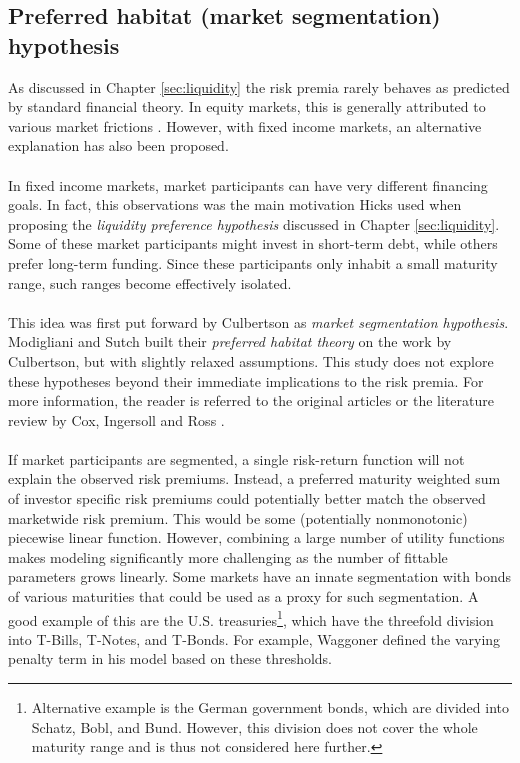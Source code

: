\documentclass[a4paper]{artikel3}
\numberwithin{equation}{section}
\numberwithin{theorem}{section}
\numberwithin{proposition}{section}
\numberwithin{lemma}{section}
\begin{document}
\subsection{Preferred habitat (market segmentation) hypothesis}
\label{sec:segmentation}


As discussed in Chapter \ref{sec:liquidity} the risk premia rarely behaves as predicted by standard financial theory. In equity markets, this is generally attributed to various market frictions \cite{baker_bradley_wurgler_2011, blitz_van_vliet_2007, frazzini_pedersen_2014}. However, with fixed income markets, an alternative explanation has also been proposed. \\
\\
In fixed income markets, market participants can have very different financing goals. In fact, this observations was the main motivation Hicks used when proposing the \emph{liquidity preference hypothesis} discussed in Chapter \ref{sec:liquidity}. Some of these market participants might invest in short-term debt, while others prefer long-term funding. Since these participants only inhabit a small maturity range, such ranges become effectively isolated. \\
\\
This idea was first put forward by Culbertson \cite{culbertson_1957} as \emph{market segmentation hypothesis}. Modigliani and Sutch \cite{modigliani_sutch_1966} built their \emph{preferred habitat theory} on the work by Culbertson, but with slightly relaxed assumptions. This study does not explore these hypotheses beyond their immediate implications to the risk premia. For more information, the reader is referred to the original articles or the literature review by Cox, Ingersoll and Ross \cite{cox_ingersoll_ross_1981}.\\
\\
If market participants are segmented, a single risk-return function will not explain the observed risk premiums. Instead, a preferred maturity weighted sum of investor specific risk premiums could potentially better match the observed marketwide risk premium. This would be some (potentially nonmonotonic) piecewise linear function. However, combining a large number of utility functions makes modeling significantly more challenging as the number of fittable parameters grows linearly. Some markets have an innate segmentation with bonds of various maturities that could be used as a proxy for such segmentation. A good example of this are the U.S. treasuries\footnote{Alternative example is the German government bonds, which are divided into Schatz, Bobl, and Bund. However, this division does not cover the whole maturity range and is thus not considered here further.}, which have the threefold division into T-Bills, T-Notes, and T-Bonds. For example, Waggoner \cite{waggoner_1997} defined the varying penalty term in his model based on these thresholds.
\end{document}
